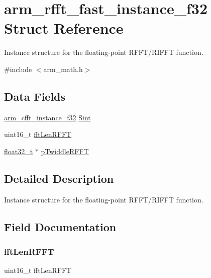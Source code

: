 \hypertarget{structarm__rfft__fast__instance__f32}{}\section{arm\+\_\+rfft\+\_\+fast\+\_\+instance\+\_\+f32 Struct Reference}
\label{structarm__rfft__fast__instance__f32}


Instance structure for the floating-\/point R\+F\+F\+T/\+R\+I\+F\+FT function.  




{\ttfamily \#include $<$arm\+\_\+math.\+h$>$}

\subsection*{Data Fields}
\begin{DoxyCompactItemize}
\item 
\mbox{\hyperlink{structarm__cfft__instance__f32}{arm\+\_\+cfft\+\_\+instance\+\_\+f32}} \mbox{\hyperlink{structarm__rfft__fast__instance__f32_aa8a05a9fabc3852e5d476152a5067e53}{Sint}}
\item 
uint16\+\_\+t \mbox{\hyperlink{structarm__rfft__fast__instance__f32_a174f8c72d545034e19ba4ced52b31353}{fft\+Len\+R\+F\+FT}}
\item 
\mbox{\hyperlink{arm__math_8h_a4611b605e45ab401f02cab15c5e38715}{float32\+\_\+t}} $\ast$ \mbox{\hyperlink{structarm__rfft__fast__instance__f32_a43370fe848d06993faf834da07ca91ce}{p\+Twiddle\+R\+F\+FT}}
\end{DoxyCompactItemize}


\subsection{Detailed Description}
Instance structure for the floating-\/point R\+F\+F\+T/\+R\+I\+F\+FT function. 

\subsection{Field Documentation}
\mbox{\label{structarm__rfft__fast__instance__f32_a174f8c72d545034e19ba4ced52b31353}} 
\subsubsection{\texorpdfstring{fftLenRFFT}{fftLenRFFT}}
{\footnotesize\ttfamily uint16\+\_\+t fft\+Len\+R\+F\+FT}

